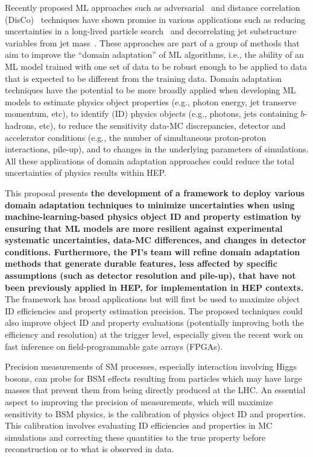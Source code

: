\documentclass[letter, USenglish, 11pt, subfigure]{article}
\begin{document}
Recently proposed ML approaches such as adversarial~\cite{louppe2017learning} and distance correlation (DisCo)~\cite{PhysRevLett.125.122001} techniques have shown promise in various applications such as reducing uncertainties in a long-lived particle search~\cite{calRatio} and decorrelating jet substructure variables from jet mass~\cite{ATL-PHYS-PUB-2018-014}.
These approaches are part of a group of methods that aim to improve the ``domain adaptation'' of ML algorithms, i.e., the ability of an ML model trained with one set of data to be robust enough to be applied to data that is expected to be different from the training data. Domain adaptation techniques have the potential to be more broadly applied when developing ML models to estimate physics object properties (e.g., photon energy, jet transerve momentum, etc), to identify (ID) physics objects (e.g., photons, jets containing $b$-hadrons, etc), to reduce the sensitivity data-MC discrepancies, detector and accelerator conditions (e.g., the number of simultaneous proton-proton interactions, pile-up), and to changes in the underlying parameters of simulations. All these applications of domain adaptation approaches could reduce the total uncertainties of physics results within HEP. 

This proposal presents {\bf the development of a framework to deploy various domain adaptation techniques to minimize uncertainties when using machine-learning-based physics object ID and property estimation by ensuring that ML models are more resilient against experimental systematic uncertainties, data-MC differences, and changes in detector conditions. Furthermore, the PI's team will refine domain adaptation methods that generate durable features, less affected by specific assumptions (such as detector resolution and pile-up), that have not been previously applied in HEP, for implementation in HEP contexts. } The framework has broad applications but will first be used to maximize object ID efficiencies and property estimation precision. The proposed techniques could also improve object ID and property evaluations (potentially improving both the efficiency and resolution) at the trigger level, especially given the recent work on fast inference on field-programmable gate arrays (FPGAs).

Precision measurements of SM processes, especially interaction involving Higgs bosons, can probe for BSM effects resulting from particles which may have large masses that prevent them from being directly produced at the LHC. An essential aspect to improving the precision of measurements, which will maximize sensitivity to BSM physics, is the calibration of physics object ID and properties. This calibration involves evaluating ID efficiencies and properties in MC simulations and correcting these quantities to the true property before reconstruction or to what is observed in data. 
\end{document}
